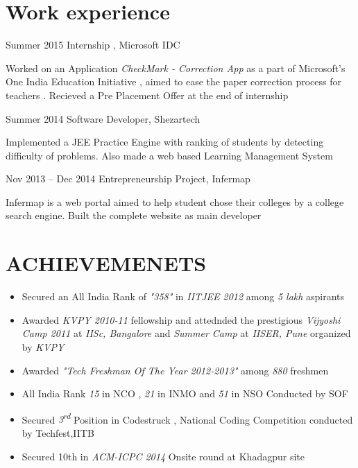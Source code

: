 \documentclass[fontsize=10pt]{tccv}
\begin{document}
\section{Work experience}

\begin{eventlist}


\item{Summer 2015}
     {}
     {Internship , Microsoft IDC}

Worked on an Application \textit{CheckMark - Correction App} as a part of Microsoft\rq s One India Education Initiative , aimed to ease the paper correction process for teachers . Recieved a Pre Placement Offer at the end of internship

\item{Summer 2014}
     {}
     {Software Developer, Shezartech }

Implemented a JEE Practice Engine with ranking of students by detecting difficulty of problems. Also made a web based Learning Management System

\item{Nov 2013 -- Dec 2014}
     {}
     {Entrepreneurship Project, Infermap}

Infermap is a web portal aimed to help student chose their colleges by a college search engine. Built the complete website as main developer


\end{eventlist}

\vspace{4mm}
\section{ACHIEVEMENETS}
\begin{itemize}
\itemsep-0.0em
\item Secured an All India Rank of {\it "358"} in {\it IITJEE 2012} among {\it 5 lakh} aspirants
\item Awarded {\it KVPY 2010-11} fellowship and  attednded the prestigious {\it Vijyoshi Camp 2011} at {\it IISc, Bangalore} and {\it Summer 
Camp} at {\it IISER, Pune} organized by {\it KVPY}
\item Awarded {\it "Tech Freshman Of The Year 2012-2013"} among {\it 880} freshmen 
\item All India Rank {\it 15} in NCO , {\it 21} in INMO and {\it 51} in NSO Conducted by SOF
\item Secured {\it 3\textsuperscript{rd}} Position in Codestruck , National Coding Competition conducted by Techfest,IITB
\item Secured 10th in {\it ACM-ICPC 2014} Onsite round at Khadagpur site
\end{itemize}
\end{document}
